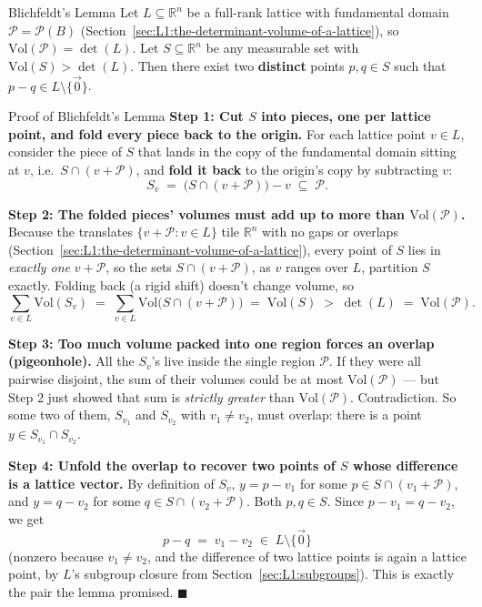 \begin{factbox}{Blichfeldt's Lemma}
Let $L \subseteq \mathbb{R}^n$ be a full-rank lattice with fundamental domain $\mathcal{P} = \mathcal{P}(B)$ (Section~\ref{sec:L1:the-determinant-volume-of-a-lattice}), so $\mathrm{Vol}(\mathcal{P}) = \det(L)$. Let $S \subseteq \mathbb{R}^n$ be any measurable set with $\mathrm{Vol}(S) > \det(L)$. Then there exist two \textbf{distinct} points $p, q \in S$ such that $p - q \in L \setminus \{\vec 0\}$.
\end{factbox}

\begin{rmkbox}{Proof of Blichfeldt's Lemma}
\textbf{Step 1: Cut $S$ into pieces, one per lattice point, and fold every piece back to the origin.} For each lattice point $v \in L$, consider the piece of $S$ that lands in the copy of the fundamental domain sitting at $v$, i.e.\ $S \cap (v + \mathcal{P})$, and \textbf{fold it back} to the origin's copy by subtracting $v$:
$$
S_v \;=\; \big(S \cap (v+\mathcal{P})\big) - v \;\subseteq\; \mathcal{P}.
$$

\textbf{Step 2: The folded pieces' volumes must add up to more than $\mathrm{Vol}(\mathcal{P})$.} Because the translates $\{v + \mathcal{P} : v \in L\}$ tile $\mathbb{R}^n$ with no gaps or overlaps (Section~\ref{sec:L1:the-determinant-volume-of-a-lattice}), every point of $S$ lies in \emph{exactly one} $v + \mathcal{P}$, so the sets $S \cap (v+\mathcal{P})$, as $v$ ranges over $L$, partition $S$ exactly. Folding back (a rigid shift) doesn't change volume, so
$$
\sum_{v \in L} \mathrm{Vol}(S_v) \;=\; \sum_{v\in L} \mathrm{Vol}\big(S \cap (v+\mathcal{P})\big) \;=\; \mathrm{Vol}(S) \;>\; \det(L) \;=\; \mathrm{Vol}(\mathcal{P}).
$$

\textbf{Step 3: Too much volume packed into one region forces an overlap (pigeonhole).} All the $S_v$'s live inside the single region $\mathcal{P}$. If they were all pairwise disjoint, the sum of their volumes could be at most $\mathrm{Vol}(\mathcal{P})$ --- but Step 2 just showed that sum is \emph{strictly greater} than $\mathrm{Vol}(\mathcal{P})$. Contradiction. So some two of them, $S_{v_1}$ and $S_{v_2}$ with $v_1 \ne v_2$, must overlap: there is a point $y \in S_{v_1} \cap S_{v_2}$.

\textbf{Step 4: Unfold the overlap to recover two points of $S$ whose difference is a lattice vector.} By definition of $S_v$, $y = p - v_1$ for some $p \in S \cap (v_1+\mathcal{P})$, and $y = q - v_2$ for some $q \in S \cap (v_2+\mathcal{P})$. Both $p,q \in S$. Since $p - v_1 = q - v_2$, we get
$$
p - q \;=\; v_1 - v_2 \;\in\; L\setminus\{\vec 0\}
$$
(nonzero because $v_1 \ne v_2$, and the difference of two lattice points is again a lattice point, by $L$'s subgroup closure from Section~\ref{sec:L1:subgroups}). This is exactly the pair the lemma promised. $\blacksquare$
\end{rmkbox}

